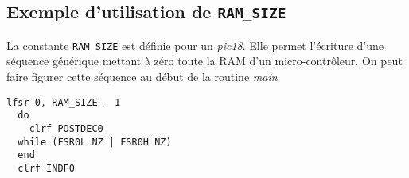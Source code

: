 \subsection{Exemple d'utilisation de \texttt{RAM\_SIZE}}

La constante \texttt{RAM\_SIZE} est définie pour un \emph{pic18}. Elle permet l'écriture d'une séquence générique mettant à zéro toute la RAM d'un micro-contrôleur. On peut faire figurer cette séquence au début de la routine \emph{main}.


\begin{lstlisting}[language=piccolo]
  lfsr 0, RAM_SIZE - 1
  do
    clrf POSTDEC0
  while (FSR0L NZ | FSR0H NZ)
  end
  clrf INDF0
\end{lstlisting}


